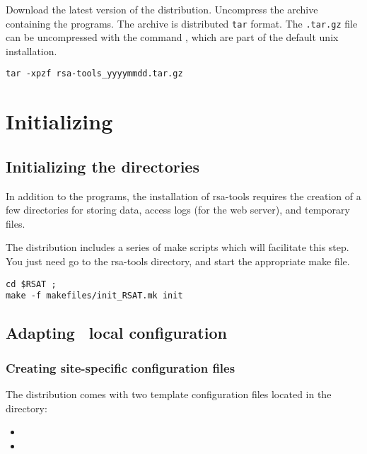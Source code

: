 \documentclass[12pt,a4paper, oneside]{scrreprt} %
\begin{document}
Download the latest version of the \RSAT distribution. Uncompress the
archive containing the programs. The archive is distributed
\texttt{tar} format. The \texttt{.tar.gz} file can be uncompressed
with the command , which are part of the default unix
installation.

\begin{lstlisting}
tar -xpzf rsa-tools_yyyymmdd.tar.gz
\end{lstlisting}
\chapter{Initializing \RSAT}




\section{Initializing the directories}

In addition to the programs, the installation of rsa-tools requires
the creation of a few directories for storing data, access logs (for
the web server), and temporary files.

The distribution includes a series of make scripts which will
facilitate this step. You just need go to the rsa-tools directory, and
start the appropriate make file.

\begin{lstlisting}
cd $RSAT ; 
make -f makefiles/init_RSAT.mk init
\end{lstlisting}

\section{Adapting \RSAT \  local configuration}

\subsection{Creating site-specific configuration files}

The \RSAT distribution comes with two template configuration files
located in the  directory:

\begin{itemize}
\item {} 
\item {}
\end{itemize}
\end{document}
